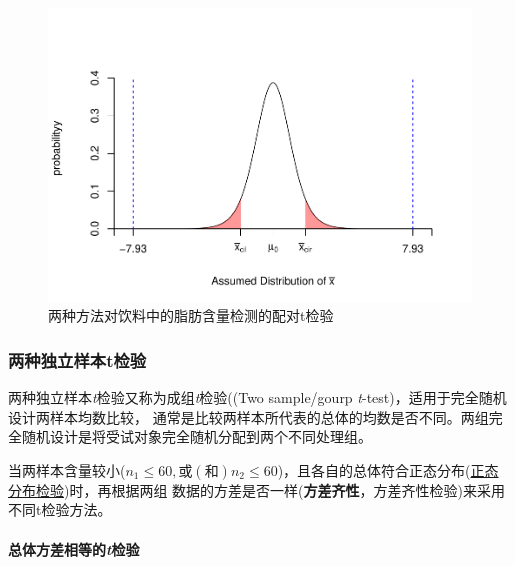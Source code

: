 \documentclass[
]{article}
\begin{document}
\begin{figure}

{\centering \includegraphics[width=0.49\linewidth,height=0.49\textheight]{figs/piredttest} 

}

\caption{两种方法对饮料中的脂肪含量检测的配对t检验}\label{fig:piredttest}
\end{figure}

\hypertarget{ux4e24ux79cdux72ecux7acbux6837ux672ctux68c0ux9a8c}{%
\subsubsection{两种独立样本t检验}\label{ux4e24ux79cdux72ecux7acbux6837ux672ctux68c0ux9a8c}}

两种独立样本\emph{t}检验又称为成组\emph{t}检验((Two sample/gourp \emph{t}-test)，适用于完全随机设计两样本均数比较，
通常是比较两样本所代表的总体的均数是否不同。两组完全随机设计是将受试对象完全随机分配到两个不同处理组。

当两样本含量较小(\(n_1\leq60,或(和)n_2\leq60\))，且各自的总体符合正态分布(\protect\hyperlink{ux6b63ux6001ux68c0ux9a8c}{正态分布检验})时，再根据两组
数据的方差是否一样(\textbf{方差齐性}，方差齐性检验)来采用不同t检验方法。

\hypertarget{ux603bux4f53ux65b9ux5deeux76f8ux7b49ux7684tux68c0ux9a8c}{%
\paragraph{\texorpdfstring{总体方差相等的\emph{t}检验}{总体方差相等的t检验}}\label{ux603bux4f53ux65b9ux5deeux76f8ux7b49ux7684tux68c0ux9a8c}}
\end{document}
